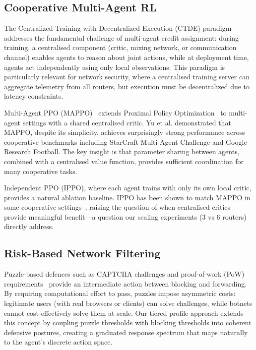 \documentclass[sigconf,nonacm]{acmart}
\begin{document}
\subsection{Cooperative Multi-Agent RL}

The Centralized Training with Decentralized Execution (CTDE) paradigm~\cite{lowe2017multi} addresses the fundamental challenge of multi-agent credit assignment: during training, a centralised component (critic, mixing network, or communication channel) enables agents to reason about joint actions, while at deployment time, agents act independently using only local observations. This paradigm is particularly relevant for network security, where a centralised training server can aggregate telemetry from all routers, but execution must be decentralized due to latency constraints.

Multi-Agent PPO (MAPPO)~\cite{yu2022surprising} extends Proximal Policy Optimization~\cite{schulman2017proximal} to multi-agent settings with a shared centralised critic. Yu et al. demonstrated that MAPPO, despite its simplicity, achieves surprisingly strong performance across cooperative benchmarks including StarCraft Multi-Agent Challenge and Google Research Football. The key insight is that parameter sharing between agents, combined with a centralised value function, provides sufficient coordination for many cooperative tasks.

Independent PPO (IPPO), where each agent trains with only its own local critic, provides a natural ablation baseline. IPPO has been shown to match MAPPO in some cooperative settings~\cite{de2020independent}, raising the question of when centralised critics provide meaningful benefit---a question our scaling experiments (3 vs 6 routers) directly address.

\subsection{Risk-Based Network Filtering}

Puzzle-based defences such as CAPTCHA challenges and proof-of-work (PoW) requirements~\cite{wang2003detecting} provide an intermediate action between blocking and forwarding. By requiring computational effort to pass, puzzles impose asymmetric costs: legitimate users (with real browsers or clients) can solve challenges, while botnets cannot cost-effectively solve them at scale. Our tiered profile approach extends this concept by coupling puzzle thresholds with blocking thresholds into coherent defensive postures, creating a graduated response spectrum that maps naturally to the agent's discrete action space.
\end{document}

